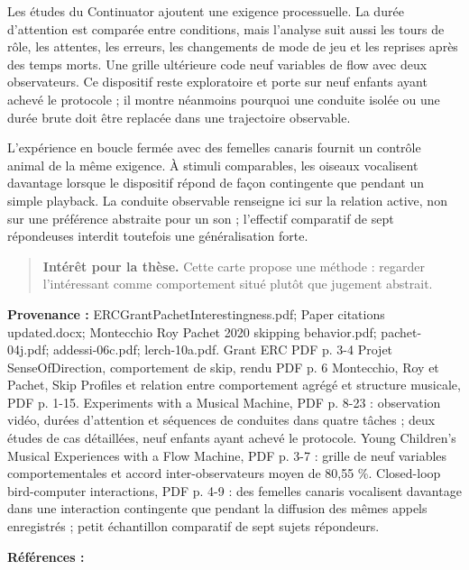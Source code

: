 \documentclass[10pt,a4paper]{article}
\begin{document}
Les études du Continuator ajoutent une exigence processuelle. La durée d'attention est comparée entre conditions, mais l'analyse suit aussi les tours de rôle, les attentes, les erreurs, les changements de mode de jeu et les reprises après des temps morts. Une grille ultérieure code neuf variables de flow avec deux observateurs. Ce dispositif reste exploratoire et porte sur neuf enfants ayant achevé le protocole ; il montre néanmoins pourquoi une conduite isolée ou une durée brute doit être replacée dans une trajectoire observable.

L'expérience en boucle fermée avec des femelles canaris fournit un contrôle animal de la même exigence. À stimuli comparables, les oiseaux vocalisent davantage lorsque le dispositif répond de façon contingente que pendant un simple playback. La conduite observable renseigne ici sur la relation active, non sur une préférence abstraite pour un son ; l'effectif comparatif de sept répondeuses interdit toutefois une généralisation forte.

\begin{quote}
\textbf{Intérêt pour la thèse.} Cette carte propose une méthode : regarder l'intéressant comme comportement situé plutôt que jugement abstrait.
\end{quote}
{\footnotesize\color{metadata}\textbf{Provenance :} ERCGrantPachetInterestingness.pdf; Paper citations updated.docx; Montecchio Roy Pachet 2020 skipping behavior.pdf; pachet-04j.pdf; addessi-06c.pdf; lerch-10a.pdf. Grant ERC PDF p. 3-4 Projet SenseOfDirection, comportement de skip, rendu PDF p. 6 Montecchio, Roy et Pachet, Skip Profiles et relation entre comportement agrégé et structure musicale, PDF p. 1-15. Experiments with a Musical Machine, PDF p. 8-23 : observation vidéo, durées d'attention et séquences de conduites dans quatre tâches ; deux études de cas détaillées, neuf enfants ayant achevé le protocole. Young Children's Musical Experiences with a Flow Machine, PDF p. 3-7 : grille de neuf variables comportementales et accord inter-observateurs moyen de 80,55 \%. Closed-loop bird-computer interactions, PDF p. 4-9 : des femelles canaris vocalisent davantage dans une interaction contingente que pendant la diffusion des mêmes appels enregistrés ; petit échantillon comparatif de sept sujets répondeurs.\par}
{\footnotesize\color{metadata}\textbf{Références :} \parencite{montecchio2020skipping,addessi2005experiments,addessi2006flowmachine,lerch2011closedloop}\par}
\end{document}
